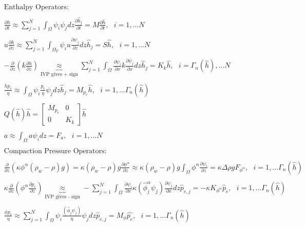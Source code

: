 \documentclass[a4paper,12pt]{article}
\newcommand{\pd}[2]{\frac{\partial #1}{\partial #2}}
\begin{document}
\begin{align*}
  &\text{Enthalpy Operators}:\\
  \\
  &\pd{h}{t} \approx \sum_{j=1}^N \int_{\Omega} \psi_i\psi_j dz\pd{\hat{h}_j}{t} = M\pd{\hat{h}}{t}, ~~~ i=1,...N\\
  \\
  & u\pd{h}{z} \approx \sum_{j=1}^N\int_{\Omega_T} \psi_iu\pd{\psi_j}{z}dz \hat{h}_j = S\hat{h} , ~~~ i=1,...N\\
  \\
  &-\pd{}{z}\left(k\pd{h}{z}\right) \underbrace{\approx}_{\text{IVP gives + sign}} \sum_{j=1}^N\int_{\Omega} \pd{\psi_i}{x}k\pd{\psi_j}{x} dz \hat{h}_j = K_k\hat{h}, ~~~ i = \Gamma_n(\hat{h}),...N\\
  \\
  &\frac{hp_e}{\eta} \approx \int_{\Omega} \psi_i \frac{p_e}{\eta}\psi_j dz \hat{h}_j = M_{p_e}\hat{h}, ~~~ i = 1,...\Gamma_n(\hat{h}) \\
  \\
  &Q(\hat{h})\hat{h} = \begin{bmatrix}
    M_{p_e} & 0\\
    0    & K_k
    \end{bmatrix} \hat{h}
  \\
  \\
  & a \approx \int_{\Omega} a\psi_i dz = F_a, ~~~ i = 1,...N \\
  \\
  &\text{Compaction Pressure Operators}:\\
  \\
  &\pd{}{z}(\kappa\phi^\alpha(\rho_w - \rho)g) = \kappa(\rho_w - \rho)g\pd{\phi^\alpha}{z} \approx \kappa(\rho_w - \rho)g \int_\Omega\phi^\alpha\pd{\psi_i}{z} = \kappa\Delta\rho g F_{\phi^\alpha}, ~~~ i=1,...\Gamma_n(\hat{h})\\
  \\
  & \kappa\pd{}{z}\left(\phi^\alpha\pd{p_e}{z}\right) \underbrace{\approx}_{\text{IVP gives - sign}} -\sum_{j=1}^N\int_{\Omega} \pd{\psi_i}{x}\kappa(\hat{\phi}_j^\alpha\psi_j)\pd{\psi_j}{x} dz \hat{p}_{e,j} = -\kappa K_{\phi^\alpha}\hat{p}_e , ~~~ i=1,...\Gamma_n(\hat{h})\\
  \\
  &\frac{\phi p_e}{\eta} \approx \sum_{j=1}^N\int_{\Omega}\psi_i \frac{(\hat{\phi}_j\psi_j)}{\eta}\psi_j dz \hat{p}_{e,j} = M_{\phi} \hat{p_e} , ~~~ i=1,...\Gamma_n(\hat{h})
\end{align*}
\end{document}
